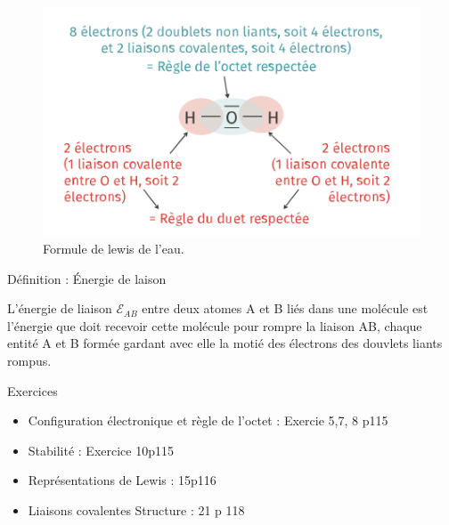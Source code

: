 \documentclass[french]{article}
\begin{document}
\begin{figure}[ht]%
	\centering
	\includegraphics[width=.5\textwidth]{FormuleDeLewis.png}
	\caption{Formule de lewis de l'eau.}
\end{figure}

\begin{definition}{Définition : Énergie de laison}

L'énergie de liaison $\mathcal{E}_{AB}$ entre deux atomes A et B liés dans une molécule est l'énergie que doit recevoir cette molécule pour rompre la liaison AB, chaque entité A et B formée gardant avec elle la motié des électrons des douvlets liants rompus. 

\end{definition}
\begin{Exercice}{Exercices}
	\begin{itemize}
		\item Configuration électronique et règle de l'octet : Exercie 5,7, 8 p115
		\item Stabilité : Exercice 10p115
		\item Représentations de Lewis : 15p116
		\item Liaisons covalentes Structure : 21 p 118
	\end{itemize}


\end{Exercice}
\end{document}
